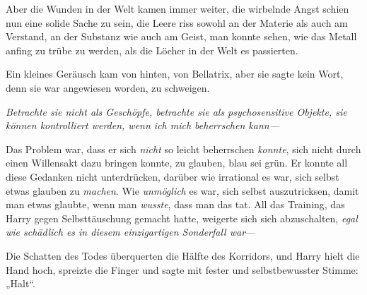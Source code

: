 Aber die Wunden in der Welt kamen immer weiter, die wirbelnde Angst schien nun eine solide Sache zu sein, die Leere riss sowohl an der Materie als auch am Verstand, an der Substanz wie auch am Geist, man konnte sehen, wie das Metall anfing zu trübe zu werden, als die Löcher in der Welt es passierten.

Ein kleines Geräusch kam von hinten, von Bellatrix, aber sie sagte kein Wort, denn sie war angewiesen worden, zu schweigen.

\emph{Betrachte sie nicht als Geschöpfe, betrachte sie als psychosensitive Objekte, sie können kontrolliert werden, wenn ich mich beherrschen kann—}

Das Problem war, dass er sich \emph{nicht} so leicht beherrschen \emph{konnte}, sich nicht durch einen Willensakt dazu bringen konnte, zu glauben, blau sei grün. Er konnte all diese Gedanken nicht unterdrücken, darüber wie irrational es war, sich selbst etwas glauben zu \emph{machen}. Wie \emph{unmöglich} es war, sich selbst auszutricksen, damit man etwas glaubte, wenn man \emph{wusste}, dass man das tat. All das Training, das Harry gegen Selbsttäuschung gemacht hatte, weigerte sich sich abzuschalten, \emph{egal wie schädlich es in diesem einzigartigen Sonderfall war}—

Die Schatten des Todes überquerten die Hälfte des Korridors, und Harry hielt die Hand hoch, spreizte die Finger und sagte mit fester und selbstbewusster Stimme:
„Halt“.

